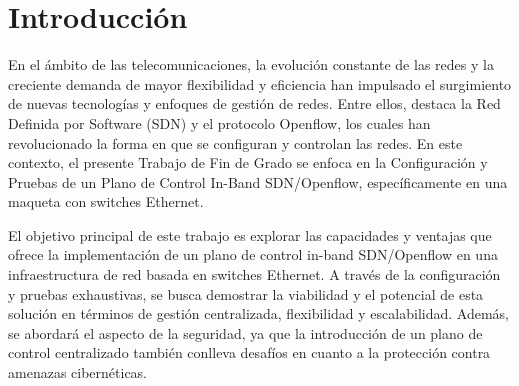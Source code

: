 \documentclass[a4paper, 12pt]{book}
\begin{document}
	
	
	\tableofcontents 
	\cleardoublepage
	\listoffigures %
	
	
	
	\clearpage
	\chapter{Introducción}
	\label{sec:intro} %
	
	
	En el ámbito de las telecomunicaciones, la evolución constante de las redes y la creciente demanda de mayor flexibilidad y eficiencia han impulsado el surgimiento de nuevas tecnologías y enfoques de gestión de redes. Entre ellos, destaca la Red Definida por Software (SDN) y el protocolo Openflow, los cuales han revolucionado la forma en que se configuran y controlan las redes. En este contexto, el presente Trabajo de Fin de Grado se enfoca en la Configuración y Pruebas de un Plano de Control In-Band SDN/Openflow, específicamente en una maqueta con switches Ethernet.
	
	El objetivo principal de este trabajo es explorar las capacidades y ventajas que ofrece la implementación de un plano de control in-band SDN/Openflow en una infraestructura de red basada en switches Ethernet. A través de la configuración y pruebas exhaustivas, se busca demostrar la viabilidad y el potencial de esta solución en términos de gestión centralizada, flexibilidad y escalabilidad. Además, se abordará el aspecto de la seguridad, ya que la introducción de un plano de control centralizado también conlleva desafíos en cuanto a la protección contra amenazas cibernéticas.
	
\end{document}
